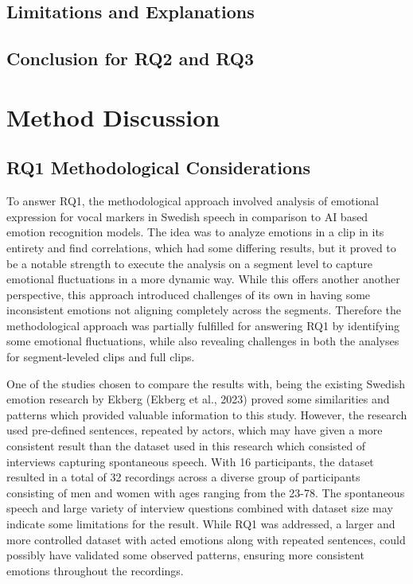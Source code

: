 \subsection{Limitations and Explanations}
\subsection{Conclusion for RQ2 and RQ3}

\section{Method Discussion}
\subsection{RQ1 Methodological Considerations}
To answer RQ1, the methodological approach involved analysis of emotional expression for vocal markers in Swedish speech in comparison to AI based emotion recognition models. The idea was to analyze emotions in a clip in its entirety and find correlations, which had some differing results, but it proved to be a notable strength to execute the analysis on a segment level to capture emotional fluctuations in a more dynamic way. While this offers another another perspective, this approach introduced challenges of its own in having some inconsistent emotions not aligning completely across the segments. Therefore the methodological approach was partially fulfilled for answering RQ1 by identifying some emotional fluctuations, while also revealing challenges in both the analyses for segment-leveled clips and full clips.

One of the studies chosen to compare the results with, being the existing Swedish emotion research by Ekberg (Ekberg et al., 2023) proved some similarities and patterns which provided valuable information to this study.  However, the research used pre-defined sentences, repeated by actors, which may have given a more consistent result than the dataset used in this research which consisted of interviews capturing spontaneous speech. With 16 participants, the dataset resulted in a total of 32 recordings across a diverse group of participants consisting of men and women with ages ranging from the 23-78. The spontaneous speech and large variety of interview questions combined with dataset size may indicate some limitations for the result. While RQ1 was addressed, a larger and more controlled dataset with acted emotions along with repeated sentences, could possibly have validated some observed patterns, ensuring more consistent emotions throughout the recordings.

